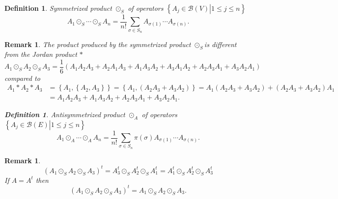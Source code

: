 \documentclass[aps,preprint]{revtex4}%
\newtheorem{definition}[theorem]{Definition}
\newtheorem{remark}[theorem]{Remark}
\begin{document}
\begin{definition}
Symmetrized product $\odot_{S}$ of operators $\left\{  \left.  A_{j}%
\in\mathcal{B}\left(  V\right)  \right\vert 1\leq j\leq n\right\}  $
\begin{equation}
A_{1}\odot_{S}\cdots\odot_{S}A_{n}=\frac{1}{n!}\sum_{\sigma\in S_{n}}%
A_{\sigma\left(  1\right)  }\cdots A_{\sigma\left(  n\right)  }.
\end{equation}

\end{definition}

\begin{remark}
The product produced by the symmetrized product $\odot_{S}$is different from
the Jordan product $\ast$
\begin{equation}
A_{1}\odot_{S}A_{2}\odot_{S}A_{3}=\frac{1}{6}\left(  A_{1}A_{2}A_{3}%
+A_{2}A_{1}A_{3}+A_{1}A_{3}A_{2}+A_{3}A_{1}A_{2}+A_{2}A_{3}A_{1}+A_{3}%
A_{2}A_{1}\right)
\end{equation}
compared to
\begin{align}
A_{1}\ast A_{2}\ast A_{3}  &  =\left\{  A_{1},\left\{  A_{2},A_{3}\right\}
\right\}  =\left\{  A_{1},\left(  A_{2}A_{3}+A_{3}A_{2}\right)  \right\}
=A_{1}\left(  A_{2}A_{3}+A_{3}A_{2}\right)  +\left(  A_{2}A_{3}+A_{3}%
A_{2}\right)  A_{1}\\
&  =A_{1}A_{2}A_{3}+A_{1}A_{3}A_{2}+A_{2}A_{3}A_{1}+A_{3}A_{2}A_{1}.
\end{align}


\begin{definition}
Antisymmetrized product $\odot_{A}$ of operators $\left\{  \left.  A_{j}%
\in\mathcal{B}\left(  E\right)  \right\vert 1\leq j\leq n\right\}  $
\begin{equation}
A_{1}\odot_{A}\cdots\odot_{A}A_{n}=\frac{1}{n!}\sum_{\sigma\in S_{n}}%
\pi\left(  \sigma\right)  A_{\sigma\left(  1\right)  }\cdots A_{\sigma\left(
n\right)  }.
\end{equation}

\end{definition}
\end{remark}

\begin{remark}%
\begin{equation}
\left(  A_{1}\odot_{S}A_{2}\odot_{S}A_{3}\right)  ^{t}=A_{3}^{t}\odot_{S}%
A_{2}^{t}\odot_{S}A_{1}^{t}=A_{1}^{t}\odot_{S}A_{2}^{t}\odot_{S}A_{3}^{t}%
\end{equation}
If $A=A^{t}$ then
\begin{equation}
\left(  A_{1}\odot_{S}A_{2}\odot_{S}A_{3}\right)  ^{t}=A_{1}\odot_{S}%
A_{2}\odot_{S}A_{3}.
\end{equation}

\end{remark}
\end{document}
